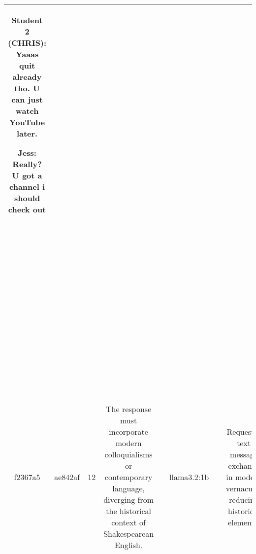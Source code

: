 \begin{table}[h!]
\begin{tabular}{|c|c|c|c|c|c|c|c|c|c|c|}
 Student 2 (CHRIS): Yaaas quit already tho. U can just watch YouTube later.

Jess: Really? U got a channel i should check out &  & \\
\hline
f2367a5 & ae842af & 12 & The response must incorporate modern colloquialisms or contemporary language, diverging from the historical context of Shakespearean English. &  & llama3.2:1b &  & Request a text message exchange in modern vernacular reducing historical elements. & Here are two text message exchanges:

**Message 1:**
[02:34 PM] Emily: Dude, I had an amazing dinner last night at that new restaurant downtown! You should come with me next time.

**Response from Alex:** 
[02:37 PM] Alex: Yaaas, really? I'm free tomorrow or the night after. What's in it for you?

**Message 2 (next day):**
[03:15 PM] Emily: Hey, just wanted to follow up on our dinner invite! Unfortunately, my schedule is pretty packed right now but I'd love to catch up soon.

**Response from Alex:** 
[03:20 PM] Alex: Sounds good. Just let me know when works for you. Maybe we can plan something else soon? &  & \\
\hline
4efb139 & ae842af & 12 & The response must incorporate modern colloquialisms or contemporary language, diverging from the historical context of Shakespearean English. &  & llama3.2:1b &  & Draft a casual party invite using current expressions and slang. & Fair friends!

Hark! I conjure thee to a night of merriment and delight, as I extolled the virtues of this most noble soiree.

**"Thou" art cordially invited**

To join me in revelry and rapturous laughter at an epic bash, where **"good fellowship" shall flow like nectar**, and **"jokes"**: old and new, will be **"launched"** upon our merry company!

**A "low-key" gathering**, to be held on a [insert day] at [insert time], shall delight thy senses with:

Deluxe grub (alas, we'll spare thy appetite for now)
Craft cocktails, concocted by the finest artisans
Vocal ditties, and the sheer **"mirthfulness"** of it all!

To those my own kin,
I extend this hospitable invitation:
RSVP: [insert RSVP details]
Come forth, ye merry makers! I await thee with open arms.


\end{tabular}
\end{table}
